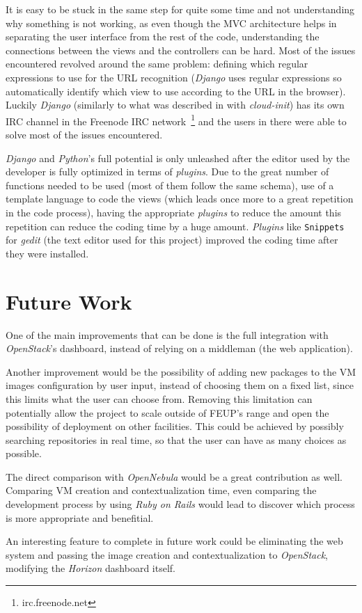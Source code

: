 It is easy to be stuck in the same step for quite some time and not understanding why something is not working, as even though the MVC architecture helps in separating the user interface from the rest of the code, understanding the connections between the views and the controllers can be hard. Most of the issues encountered revolved around the same problem: defining which regular expressions to use for the URL recognition (\textit{Django} uses regular expressions so automatically identify which view to use according to the URL in the browser). Luckily \textit{Django} (similarly to what was described in  with \textit{cloud-init}) has its own IRC channel in the Freenode IRC network~\footnote{irc.freenode.net} and the users in there were able to solve most of the issues encountered.

\textit{Django} and \textit{Python}'s full potential is only unleashed after the editor used by the developer is fully optimized in terms of \textit{plugins}. Due to the great number of functions needed to be used (most of them follow the same schema), use of a template language to code the views (which leads once more to a great repetition in the code process), having the appropriate \textit{plugins} to reduce the amount this repetition can reduce the coding time by a huge amount. \textit{Plugins} like \texttt{Snippets} for \textit{gedit} (the text editor used for this project) improved the coding time after they were installed.

\section{Future Work}\label{sec:future-work}

One of the main improvements that can be done is the full integration with \textit{OpenStack}'s dashboard, instead of relying on a middleman (the web application).

Another improvement would be the possibility of adding new packages to the VM images configuration by user input, instead of choosing them on a fixed list, since this limits what the user can choose from. Removing this limitation can potentially allow the project to scale outside of FEUP's range and open the possibility of deployment on other facilities. This could be achieved by possibly searching repositories in real time, so that the user can have as many choices as possible.

The direct comparison with \textit{OpenNebula} would be a great contribution as well. Comparing VM creation and contextualization time, even comparing the development process by using \textit{Ruby on Rails} would lead to discover which process is more appropriate and benefitial.







An interesting feature to complete in future work could be eliminating the web system and passing the image creation and contextualization to \textit{OpenStack}, modifying the \textit{Horizon} dashboard itself.
